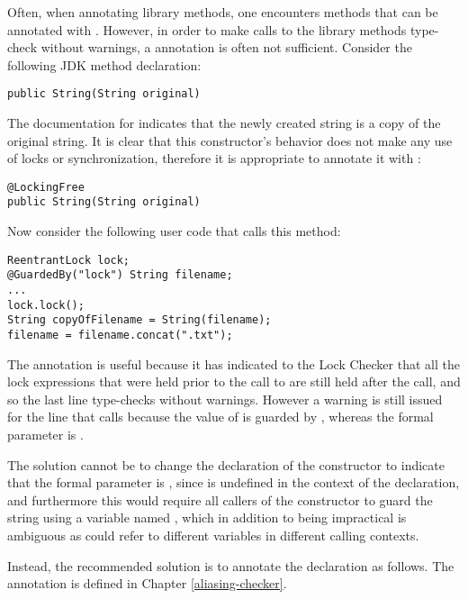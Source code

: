 Often, when annotating library methods, one encounters methods that can
be annotated with .  However, in order to make calls
to the library methods type-check without warnings, a 
annotation is often not sufficient.  Consider the following JDK method declaration:

\begin{verbatim}
public String(String original)
\end{verbatim}

The documentation for 
indicates that the newly created string is a copy of the original string.
It is clear that this constructor's behavior does not make any use of
locks or synchronization, therefore it is appropriate to annotate it
with :

\begin{verbatim}
@LockingFree
public String(String original)
\end{verbatim}

Now consider the following user code that calls this method:

\begin{verbatim}
ReentrantLock lock;
@GuardedBy("lock") String filename;
...
lock.lock();
String copyOfFilename = String(filename);
filename = filename.concat(".txt");
\end{verbatim}

The  annotation is useful because it has indicated to the
Lock Checker that all the lock expressions that were held prior to the
call to  are still held after the call, and so the
last line type-checks without warnings.  However a warning is still issued
for the line that calls  because the value of
 is guarded by , whereas the formal parameter
 is .

The solution cannot be to change the declaration of the constructor to
indicate that the formal parameter is , since
 is undefined in the context of the declaration, and furthermore
this would require all callers of the constructor to guard the string
using a variable named , which in addition to being impractical
is ambiguous as  could refer to different variables in different
calling contexts.

Instead, the recommended solution is to annotate the declaration as follows.
The  annotation is defined
in Chapter \ref{aliasing-checker}.

